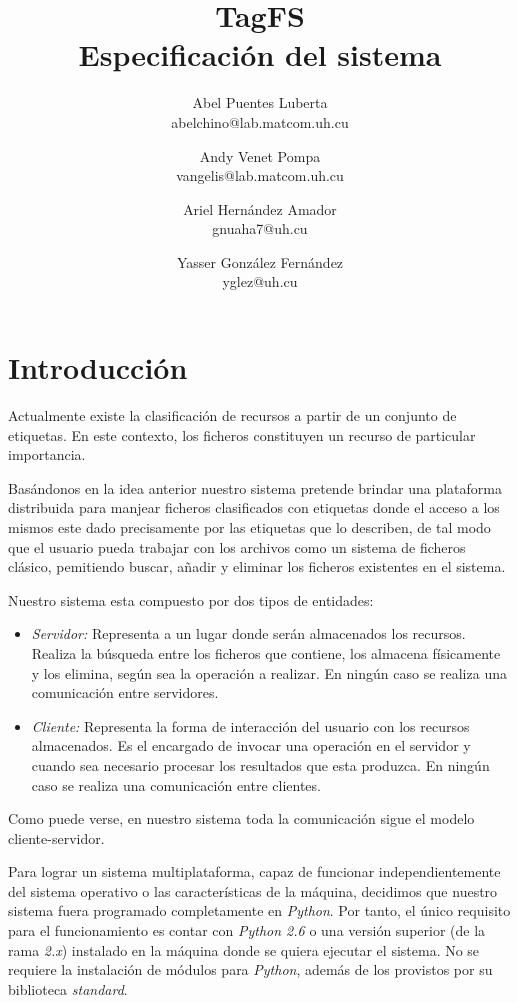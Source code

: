 \documentclass{article}
\title{
	\LARGE{TagFS} \\
	\Large{Especificación del sistema}
}
\author{
  	Abel Puentes Luberta \\
  	\small{abelchino@lab.matcom.uh.cu}
  	\and
  	Andy Venet Pompa \\
  	\small{vangelis@lab.matcom.uh.cu}
  	\and
  	Ariel Hernández Amador \\
  	\small{gnuaha7@uh.cu}
  	\and
  	Yasser González Fernández \\
  	\small{yglez@uh.cu} 	
}
\date{}
\begin{document}
\maketitle

\thispagestyle{empty}

\newpage

\setcounter{page}{1}

\section{Introducción}

Actualmente existe la clasificación de recursos a partir de un conjunto de 
etiquetas. En este contexto, los ficheros constituyen un recurso de particular 
importancia. 

Basándonos en la idea anterior nuestro sistema pretende brindar una plataforma
distribuida para manjear ficheros clasificados con etiquetas donde el acceso
a los mismos este dado precisamente por las etiquetas que lo describen, de tal
modo que el usuario pueda trabajar con los archivos como un sistema de ficheros
clásico, pemitiendo buscar, añadir y eliminar los ficheros existentes en el
sistema.

Nuestro sistema esta compuesto por dos tipos de entidades:

\begin{itemize}
  \item \emph{Servidor:} Representa a un lugar  donde serán almacenados los
  recursos. Realiza la búsqueda entre los ficheros que contiene, los almacena
  físicamente y los elimina, según sea la operación a realizar. En ningún caso
  se realiza una comunicación entre servidores.
  
  \item \emph{Cliente:} Representa la forma de interacción del usuario con los
  recursos almacenados. Es el encargado de invocar una operación en el servidor
  y cuando sea necesario procesar los resultados que esta produzca. En ningún
  caso se realiza una comunicación entre clientes.
\end{itemize}

Como puede verse, en nuestro sistema toda la comunicación sigue el modelo
cliente-servidor.

Para lograr un sistema multiplataforma, capaz de funcionar independientemente
del sistema operativo o las características de la máquina, decidimos que nuestro
sistema fuera programado completamente en \emph{Python}. Por tanto, el único
requisito para el funcionamiento es contar con \emph{Python 2.6} o una versión
superior (de la rama \emph{2.x}) instalado en la máquina donde se quiera ejecutar 
el sistema. No se requiere la instalación de módulos para \emph{Python},
además de los provistos por su biblioteca \emph{standard}.
\end{document}
